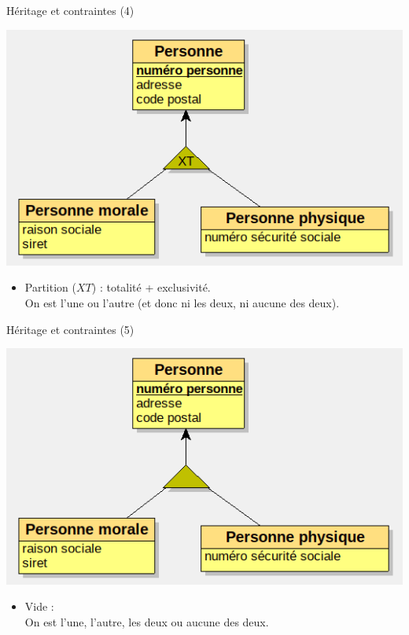 \begin{framentitle}{Héritage et contraintes (4)}
    \begin{center}
    \includegraphics[width=.8\textwidth]{heritage_xt.png}
    \end{center}
    \begin{itemize}
        \item Partition ($XT$) : totalité + exclusivité.\\On est l'une ou l'autre
            (et donc ni les deux, ni aucune des deux).
    \end{itemize}
\end{framentitle}

\begin{framentitle}{Héritage et contraintes (5)}
    \begin{center}
    \includegraphics[width=.8\textwidth]{heritage_vide.png}
    \end{center}
    \begin{itemize}
        \item Vide :\\On est l'une, l'autre, les deux ou aucune des deux.
    \end{itemize}
\end{framentitle}


